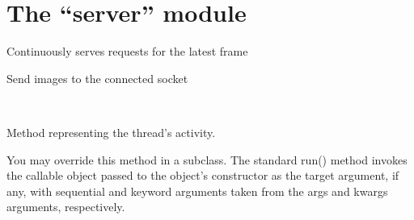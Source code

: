 \documentclass[letterpaper,10pt,english]{sphinxmanual}
\begin{document}
\chapter{The “server” module}
\label{\detokenize{index:module-server}}\label{\detokenize{index:the-server-module}}

\begin{fulllineitems}
\label{\detokenize{index:server.FootageStream}}
Continuously serves requests for the latest frame

\begin{fulllineitems}
\label{\detokenize{index:server.FootageStream.run}}
Send images to the connected socket

\end{fulllineitems}


\end{fulllineitems}


\begin{fulllineitems}
\label{\detokenize{index:server.Reciever}}~

\begin{fulllineitems}
\label{\detokenize{index:server.Reciever.run}}
Method representing the thread’s activity.

You may override this method in a subclass. The standard run() method
invokes the callable object passed to the object’s constructor as the
target argument, if any, with sequential and keyword arguments taken
from the args and kwargs arguments, respectively.

\end{fulllineitems}


\end{fulllineitems}
\end{document}
